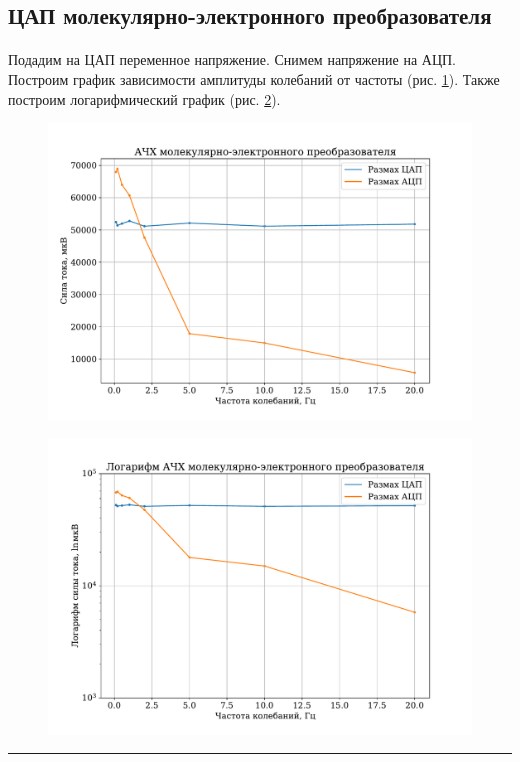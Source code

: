 \documentclass[a4paper,12pt]{article} %
\begin{document}
\subsection{ЦАП молекулярно-электронного преобразователя}

\paragraph{} Подадим на ЦАП переменное напряжение. Снимем напряжение на АЦП. Построим график зависимости амплитуды колебаний от частоты (рис. \ref{fig:afc}). Также построим логарифмический график (рис. \ref{fig:afc_log}).

\begin{figure}[h]
\centering
\includegraphics[width=\textwidth]{afc.pdf}
\caption{}
\label{fig:afc}
\end{figure}

\begin{figure}
\centering
\includegraphics[width=\textwidth]{afc_log.pdf}
\caption{}
\label{fig:afc_log}
\end{figure}


\medskip\hrule\medskip
\end{document}
